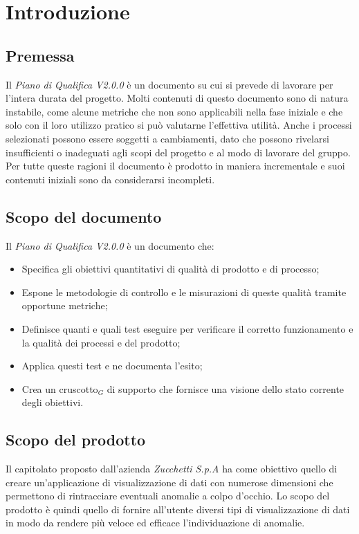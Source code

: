 \chapter{Introduzione}
\section{Premessa}

Il \textit{Piano di Qualifica V2.0.0} è un documento su cui si prevede di lavorare per l'intera durata del progetto. Molti contenuti di questo documento sono di natura instabile, come alcune metriche che non sono applicabili nella fase iniziale e che solo con il loro utilizzo pratico si può valutarne l'effettiva utilità. Anche i processi selezionati possono essere soggetti a cambiamenti, dato che possono rivelarsi insufficienti o inadeguati agli scopi del progetto e al modo di lavorare del gruppo.
Per tutte queste ragioni il documento è prodotto in maniera incrementale e suoi contenuti iniziali sono da considerarsi incompleti.

\section{Scopo del documento}
Il \textit{Piano di Qualifica V2.0.0} è un documento che:
\begin{itemize}
    \item Specifica gli obiettivi
    quantitativi di qualità di prodotto e di processo;
    \item Espone le
    metodologie di controllo e le misurazioni di queste qualità tramite
    opportune metriche;
    \item Definisce quanti e quali test eseguire per verificare il corretto funzionamento
    e la qualità dei processi e del prodotto;
    \item Applica questi test e ne documenta l'esito;
    \item Crea un cruscotto$_G$ di supporto che fornisce
    una visione dello stato corrente degli obiettivi.
\end{itemize}

\section{Scopo del prodotto}
Il capitolato proposto dall'azienda \textit{Zucchetti S.p.A} ha come obiettivo quello di creare un'applicazione di visualizzazione di dati con numerose dimensioni che permettono di rintracciare eventuali anomalie a colpo d'occhio. Lo scopo del prodotto è quindi quello di fornire all'utente diversi tipi di visualizzazione di dati in modo da rendere più veloce ed efficace l'individuazione di anomalie.

